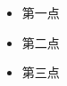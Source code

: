 \documentclass{ctexbeamer}
\begin{document}
    \begin{frame}
        \begin{itemize}[<+->]
            \item 第一点
            \item 第二点
            \item 第三点
        \end{itemize}
    \end{frame}
\end{document}
